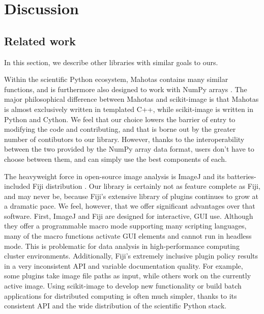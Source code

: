 
\section*{Discussion}
  \label{sec:discussion}

  \subsection*{Related work}

  In this section, we describe other libraries with similar goals to ours.
  
  Within the scientific Python ecosystem, Mahotas contains many similar
  functions, and is furthermore also designed to work with NumPy arrays
  \citep{Mahotas}. The major philosophical difference between Mahotas and
  scikit-image is that Mahotas is almost exclusively written in templated C++,
  while scikit-image is written in Python and Cython. We feel that our choice
  lowers the barrier of entry to modifying the code and contributing, and that
  is borne out by the greater number of contibutors to our library. However,
  thanks to the interoperability between the two provided by the NumPy array
  data format, users don't have to choose between them, and can simply use the
  best components of each.

  The heavyweight force in open-source image analysis is ImageJ and its
  batteries-included Fiji distribution \citep{Fiji}. Our library is
  certainly not as feature complete as Fiji, and may never be, because Fiji's
  extensive library of plugins continues to grow at a dramatic pace. We feel,
  however, that we offer significant advantages over that software. First,
  ImageJ and Fiji are designed for interactive, GUI use. Although they offer a
  programmable macro mode supporting many scripting languages, many of the
  macro functions activate GUI elements and cannot run in headless mode. This
  is problematic for data analysis in high-performance computing cluster
  environments. Additionally, Fiji's extremely inclusive plugin policy results
  in a very inconsistent API and variable documentation quality. For example,
  some plugins take image file paths as input, while others work on the
  currently active image. Using scikit-image to develop new functionality or
  build batch applications for distributed computing is often much simpler,
  thanks to its consistent API and the wide distribution of the scientific
  Python stack.

